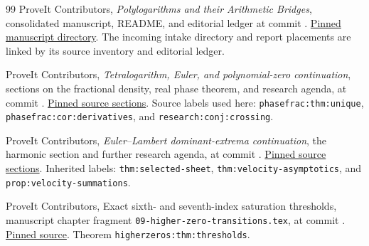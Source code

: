 \begin{thebibliography}{99}
ProveIt Contributors, \emph{Polylogarithms and their Arithmetic Bridges},
consolidated manuscript, README, and editorial ledger at commit
\texttt{\baselinecommit}.
\href{https://github.com/VladimirReshetnikov/ProveIt/tree/570b0567f311cf1890865065896be2665f469e4f/Analysis/Polylogarithms/docs/manuscript}{Pinned manuscript directory}.
The incoming intake directory and report placements are linked by its
source inventory and editorial ledger.

ProveIt Contributors, \emph{Tetralogarithm, Euler, and polynomial-zero
continuation}, sections on the fractional density, real phase theorem,
and research agenda, at commit \texttt{\baselinecommit}.
\href{https://github.com/VladimirReshetnikov/ProveIt/tree/570b0567f311cf1890865065896be2665f469e4f/Analysis/Polylogarithms/docs/reports/uniform-transition-continuation/continuations/tetralogarithm-euler-polynomial-zeros/sections}{Pinned source sections}.
Source labels used here: \texttt{phasefrac:thm:unique},
\texttt{phasefrac:cor:derivatives}, and
\texttt{research:conj:crossing}.

ProveIt Contributors, \emph{Euler--Lambert dominant-extrema continuation},
the harmonic section and further research agenda, at commit
\texttt{\baselinecommit}.
\href{https://github.com/VladimirReshetnikov/ProveIt/tree/570b0567f311cf1890865065896be2665f469e4f/Analysis/Polylogarithms/docs/reports/lerch-global-phase/continuations/euler-lambert-dominant-extrema/sections}{Pinned source sections}.
Inherited labels: \texttt{thm:selected-sheet},
\texttt{thm:velocity-asymptotics}, and
\texttt{prop:velocity-summations}.

ProveIt Contributors, Exact sixth- and seventh-index saturation
thresholds, manuscript chapter fragment
\texttt{09-higher-zero-transitions.tex}, at commit
\texttt{\baselinecommit}.
\href{https://github.com/VladimirReshetnikov/ProveIt/blob/570b0567f311cf1890865065896be2665f469e4f/Analysis/Polylogarithms/docs/manuscript/chapters/09-higher-zero-transitions.tex}{Pinned source}.
Theorem \texttt{higherzeros:thm:thresholds}.


\end{thebibliography}
